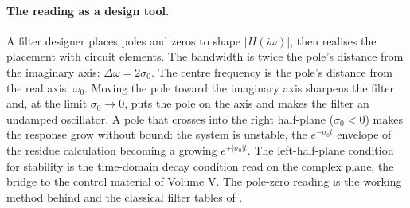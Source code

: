 \paragraph{The reading as a design tool.} A filter designer places poles
and zeros to shape $|H(i\omega)|$, then realises the placement with
circuit elements. The bandwidth is twice the pole's distance from the
imaginary axis: $\Delta\omega = 2\sigma_{0}$. The centre frequency is the
pole's distance from the real axis: $\omega_{0}$. Moving the pole toward
the imaginary axis sharpens the filter and, at the limit $\sigma_{0} \to
0$, puts the pole on the axis and makes the filter an undamped
oscillator. A pole that crosses into the right half-plane ($\sigma_{0} <
0$) makes the response grow without bound: the system is unstable, the
$e^{-\sigma_{0} t}$ envelope of the residue calculation becoming a
growing $e^{+|\sigma_{0}| t}$. The left-half-plane condition for stability
is the time-domain decay condition read on the complex plane, the bridge
to the control material of Volume V. The pole-zero reading is the working
method behind \cite[chapter 14]{text:alexander-sadiku-circuits} and the
classical filter tables of \cite[chapter 2]{text:ch06t3-williams-electronic-filter-2006}.



